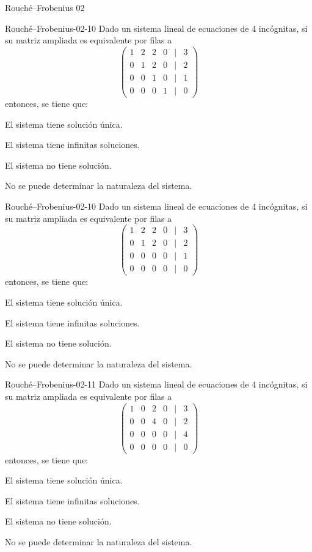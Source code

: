 \documentclass[a4,11pt]{aleph-notas}
\begin{document}
\begin{quiz}{Rouché–Frobenius 02}
\begin{multi}[]%
    {Rouché–Frobenius-02-10}
    Dado un sistema lineal de ecuaciones de 4 incógnitas, si su matriz ampliada es equivalente por filas a
    \[
    \begin{pmatrix}
    1 & 2 & 2 & 0 & | & 3 \\
    0 & 1 & 2 & 0 & | & 2 \\
    0 & 0 & 1 & 0 & | & 1 \\
    0 & 0 & 0 & 1 & | & 0
    \end{pmatrix}
    \]
    entonces, se tiene que:
    \item* El sistema tiene solución única.
    \item El sistema tiene infinitas soluciones.
    \item El sistema no tiene solución.
    \item No se puede determinar la naturaleza del sistema.
\end{multi}


\begin{multi}[]%
    {Rouché–Frobenius-02-10}
    Dado un sistema lineal de ecuaciones de 4 incógnitas, si su matriz ampliada es equivalente por filas a
    \[
    \begin{pmatrix}
    1 & 2 & 2 & 0 & | & 3 \\
    0 & 1 & 2 & 0 & | & 2 \\
    0 & 0 & 0 & 0 & | & 1 \\
    0 & 0 & 0 & 0 & | & 0
    \end{pmatrix}
    \]
    entonces, se tiene que:
    \item El sistema tiene solución única.
    \item El sistema tiene infinitas soluciones.
    \item* El sistema no tiene solución.
    \item No se puede determinar la naturaleza del sistema.
\end{multi}


\begin{multi}[]%
    {Rouché–Frobenius-02-11}
    Dado un sistema lineal de ecuaciones de 4 incógnitas, si su matriz ampliada es equivalente por filas a
    \[
    \begin{pmatrix}
    1 & 0 & 2 & 0 & | & 3 \\
    0 & 0 & 4 & 0 & | & 2 \\
    0 & 0 & 0 & 0 & | & 4 \\
    0 & 0 & 0 & 0 & | & 0
    \end{pmatrix}
    \]
    entonces, se tiene que:
    \item El sistema tiene solución única.
    \item El sistema tiene infinitas soluciones.
    \item* El sistema no tiene solución.
    \item No se puede determinar la naturaleza del sistema.
\end{multi}



\end{quiz}
\end{document}
